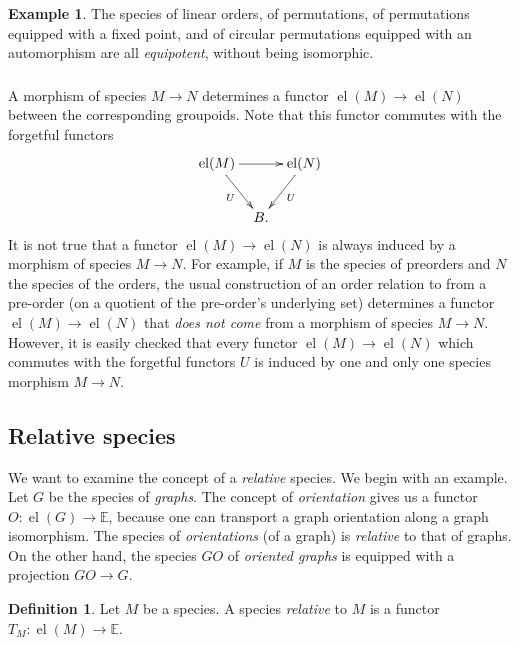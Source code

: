 \documentclass{amsart}
\theoremstyle{definition}
\newtheorem{defn}[thm]{Definition}
\newtheorem{ex}{Example}
\theoremstyle{remark}
\newcommand{\E}{\mathbb{E}}
\DeclareMathOperator{\el}{el}
\begin{document}
\begin{ex}
  The species of linear orders, of permutations, of permutations
  equipped with a fixed point, and of circular permutations equipped
  with an automorphism are all \emph{equipotent}, without being
  isomorphic.
\end{ex}

\subsubsection{} A morphism of species $M \to N$ determines a functor
$\el (M) \to \el (N)$ between the corresponding groupoids. Note that
this functor commutes with the forgetful functors \[ \xymatrix@C=0.7em{\el(M)
  \ar[rr] \ar[dr]_U & & \el(N) \ar[dl]^U \\ & B.} \]
It is not true that a functor $\el (M) \to \el (N)$ is always induced
by a morphism of species $M \to N$. For example, if $M$ is the species
of preorders and $N$ the species of the orders, the usual construction
of an order relation to from a pre-order (on a quotient of the
pre-order's underlying set) determines a functor $\el (M) \to \el (N)$
that \emph{does not come} from a morphism of species $M \to
N$. However, it is easily checked that every functor $\el (M) \to \el
(N)$ which commutes with the forgetful functors $U$ is induced by one
and only one species morphism $M \to N$.

\subsection{Relative species}
\label{sec:relative-species}

We want to examine the concept of a \emph{relative} species. We begin
with an example. Let $G$ be the species of \emph{graphs}. The concept
of \emph{orientation} gives us a functor $O : \el (G) \to \E$, because
one can transport a graph orientation along a graph isomorphism. The
species of \emph{orientations} (of a graph) is \emph{relative} to that
of graphs. On the other hand, the species $GO$ of \emph{oriented
  graphs} is equipped with a projection $GO \to G$.

\begin{defn}
  Let $M$ be a species. A species \emph{relative} to $M$ is a functor
  $T_M : \el (M) \to \E$.
\end{defn}
\end{document}
